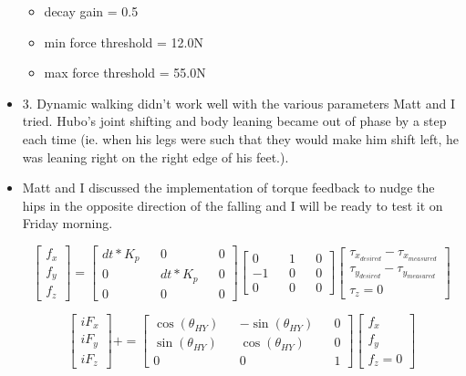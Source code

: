 \documentclass[letterpaper, 10 pt]{report}
\begin{document}
\begin{itemize}
\begin{itemize}
\item decay gain = 0.5
\item min force threshold = 12.0N
\item max force threshold = 55.0N
\end{itemize} 
\item 3. Dynamic walking didn't work well with the various parameters Matt and I tried. Hubo's joint shifting and body leaning became out of phase by a step each time (ie. when his legs were such that they would make him shift left, he was leaning right on the right edge of his feet.).
\item Matt and I discussed the implementation of torque feedback to nudge the hips in the opposite direction of the falling and I will be ready to test it on Friday morning.

\begin{equation}
\begin{bmatrix}
f_x \\ 
f_y \\
f_z
\end{bmatrix}
=
\begin{bmatrix}
dt*K_p && 0 && 0 \\
0 && dt*K_p && 0 \\
0 && 0 && 0
\end{bmatrix}
\begin{bmatrix}
0 && 1 && 0 \\
-1 && 0 && 0 \\
0 && 0 && 0
\end{bmatrix}
\begin{bmatrix}
\tau_{x_{desired}} - \tau_{x_{measured}} \\
\tau_{y_{desired}} - \tau_{y_{measured}} \\
\tau_z = 0
\end{bmatrix}
\end{equation}

\begin{equation}
\begin{bmatrix}
iF_x \\
iF_y \\
iF_z
\end{bmatrix}
+=
\begin{bmatrix}
\cos(\theta_{HY}) && -\sin(\theta_{HY}) && 0 \\
\sin(\theta_{HY}) && \cos(\theta_{HY}) && 0 \\
0 && 0 && 1
\end{bmatrix}
\begin{bmatrix}
f_x \\
f_y \\
f_z = 0
\end{bmatrix}
\end{equation}


\end{itemize}
\end{document}
